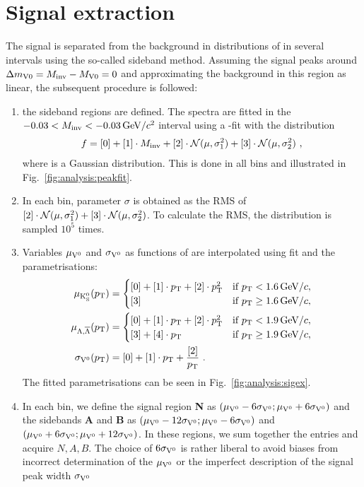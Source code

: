\section{Signal extraction}
The \VO signal is separated from the background in distributions of \Minv in several \pt intervals using the so-called sideband method. Assuming the signal peaks around $\Delta m_{\rm V 0}=M_{\text{inv}}-M_{\rm V 0}=0$ and approximating the background in this region as linear, the subsequent procedure is followed:
\begin{enumerate}
\item the sideband regions are defined. The \Minv spectra are fitted in the $-0.03<M_{\text{inv}}<-0.03 \text{\,GeV/$c^2$}$ interval using a \Chisq-fit with the distribution
\begin{align}
f = [0] + [1]\cdot M_{\text{inv}} + [2] \cdot \mathcal{N} (\mu,\sigma_1^2) + [3] \cdot \mathcal{N} (\mu,\sigma_2^2) \, \, ,
\end{align}
where \Gaus is a Gaussian distribution. This is done in all \pt bins and illustrated in Fig.~\ref{fig:analysis:peakfit}.
\item In each \pt bin, parameter $\sigma$ is obtained as the RMS of $[2] \cdot \mathcal{N} (\mu,\sigma_1^2) + [3]\cdot \mathcal{N} (\mu,\sigma_2^2)$. To calculate the RMS, the distribution is sampled $10^5$ times.
\item Variables $\mu_{\rm V^0}$ and $\sigma_{\rm V^0}$ as functions of \pt are interpolated using \Chisq fit and the parametrisations:
\begin{align}
\mu_{\rm{K^0_S}} (p_{\text{T}}) &= \begin{cases}
              [0]+[1]\cdot p_{\text{T}} + [2]\cdot p_{\text{T}}^2 & \text{if } p_{\text{T}} < 1.6 \text{\,GeV/$c$} ,\\
              [3] & \text{if } p_{\text{T}} \geq 1.6 \text{\,GeV/$c$} ,
          \end{cases} \\
\mu_{\Lambda,\overline{\Lambda}} (p_{\text{T}}) &= \begin{cases}
              [0]+[1]\cdot p_{\text{T}} + [2]\cdot p_{\text{T}}^2 & \text{if } p_{\text{T}} < 1.9 \text{\,GeV/$c$} ,\\
              [3] + [4]\cdot p_{\text{T}} & \text{if } p_{\text{T}} \geq 1.9 \text{\,GeV/$c$} ,
          \end{cases} \\
\sigma_{\rm V^0} (p_{\text{T}}) &= [0] + [1] \cdot p_{\text{T}} + \dfrac{[2]}{p_{\text{T}}} \, \, .
\end{align}
The fitted parametrisations can be seen in Fig.~\ref{fig:analysis:sigex}.
\item In each \pt bin, we define the signal region \textbf{N} as $(\mu_{\rm V^0} - 6\sigma_{\rm V^0};\mu_{\rm V^0} + 6\sigma_{\rm V^0})$ and the sidebands \textbf{A} and \textbf{B} as $(\mu_{\rm V^0} - 12\sigma_{\rm V^0}; \mu_{\rm V^0} - 6\sigma_{\rm V^0})$ and $(\mu_{\rm V^0} + 6\sigma_{\rm V^0};\mu_{\rm V^0} + 12\sigma_{\rm V^0})$. In these regions, we sum together the entries and acquire $N, A, B$. The choice of $6\sigma_{\rm V^0}$ is rather liberal to avoid biases from incorrect determination of the $\mu_{\rm V^0}$ or the imperfect description of the signal peak width $\sigma_{\rm V^0}$

\end{enumerate}

